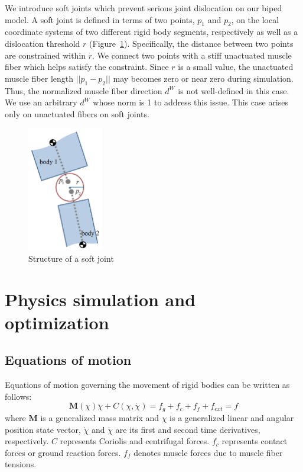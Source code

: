 \documentclass[master,english,final]{kaist-ucs}
\begin{document}
We introduce soft joints which prevent serious joint dislocation on our biped model.
A soft joint is defined in terms of two points, $p_1$ and $p_2$, on the local coordinate systems of two
different rigid body segments, respectively as well as a dislocation threshold $r$ (Figure~\ref{fig:softjoint}).
Specifically, the distance between two points are constrained within $r$.
We connect two points with a stiff unactuated muscle fiber which helps satisfy the constraint.
Since $r$ is a small value, the unactuated muscle fiber length $||p_{1}-p_{2}||$ may becomes zero
or near zero during simulation. Thus, the normalized muscle fiber direction $d^W$ is not well-defined in this case.
We use an arbitrary $d^W$ whose norm is 1 to address this issue. This case arises only on unactuated fibers on soft joints.



\begin{figure}[h!]
  \centering
  \includegraphics[width=1.3in]{softjoint}
  \caption{Structure of a soft joint}
  \label{fig:softjoint}
\end{figure}


\chapter{Physics simulation and optimization}

\section{Equations of motion}

Equations of motion governing the movement of rigid bodies can be written as follows:
\begin{equation}\label{MoEq2}
\mathbf{M}(\chi)\ddot\chi + C(\chi,\dot\chi )
 = f_g + f_c + f_f  + f_{ext} = f
\end{equation}
where $\mathbf{M}$ is a generalized mass matrix and $\chi$ is a generalized
linear and angular position
state vector, $\dot\chi$ and $\ddot\chi$ are its first and second time derivatives,
respectively. $C$ represents Coriolis and centrifugal forces.
$f_c$ represents contact forces or ground reaction forces.
$f_f$ denotes muscle forces due to muscle fiber tensions.
\end{document}
